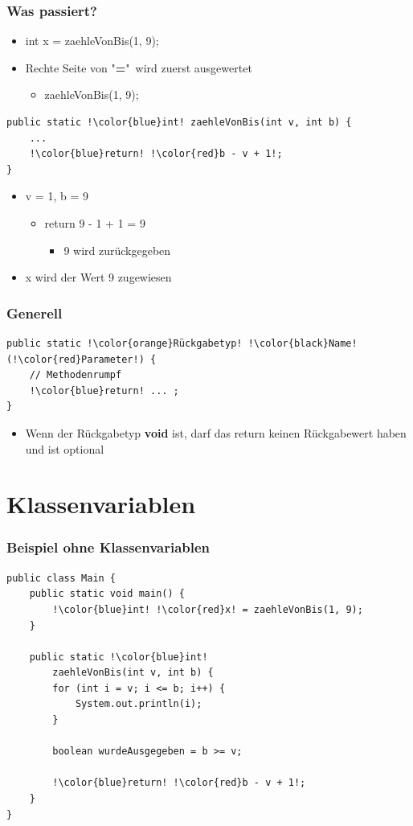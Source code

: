 \documentclass[final]{beamer}
\begin{document}
\begin{frame}[containsverbatim]
	\frametitle{Was passiert?}
	\begin{itemize}
		\item{{\color{blue}int} {\color{red}x} = zaehleVonBis(1, 9);}
		\item{Rechte Seite von "\textbf{=}"\ wird zuerst ausgewertet
			\begin{itemize}
				\item{zaehleVonBis(1, 9);}
			\end{itemize}
		}
	\end{itemize}
	\begin{lstlisting}[escapechar=!]
public static !\color{blue}int! zaehleVonBis(int v, int b) {
	...
	!\color{blue}return! !\color{red}b - v + 1!;
}\end{lstlisting}
	\begin{itemize}
		\item{v = 1, b = 9
			\begin{itemize}
				\item{return 9 - 1 + 1 = 9}
					\begin{itemize}
						\item{9 wird zurückgegeben}
					\end{itemize}
			\end{itemize}
		}
		\item{{\color{red}x} wird der Wert 9 zugewiesen}
	\end{itemize}
\end{frame}

\begin{frame}[containsverbatim]
	\frametitle{Generell}
	\begin{lstlisting}[escapechar=!]
public static !\color{orange}Rückgabetyp! !\color{black}Name! (!\color{red}Parameter!) {
	// Methodenrumpf
	!\color{blue}return! ... ; 
}
	\end{lstlisting}
	\begin{itemize}
		\item{Wenn der {\color{blue}Rückgabetyp} \textbf{void} ist, darf das {\color{blue}return} keinen Rückgabewert haben und ist optional}
	\end{itemize}
\end{frame}

\section{Klassenvariablen}
\begin{frame}[containsverbatim]
	\frametitle{Beispiel ohne Klassenvariablen}
	\begin{lstlisting}[escapechar=!]
public class Main {
	public static void main() {
		!\color{blue}int! !\color{red}x! = zaehleVonBis(1, 9);
	}
	
	public static !\color{blue}int! 
		zaehleVonBis(int v, int b) {
		for (int i = v; i <= b; i++) {
			System.out.println(i);
		}
		
		boolean wurdeAusgegeben = b >= v;
		
		!\color{blue}return! !\color{red}b - v + 1!;
	}
}
	\end{lstlisting}
\end{frame}
\end{document}
